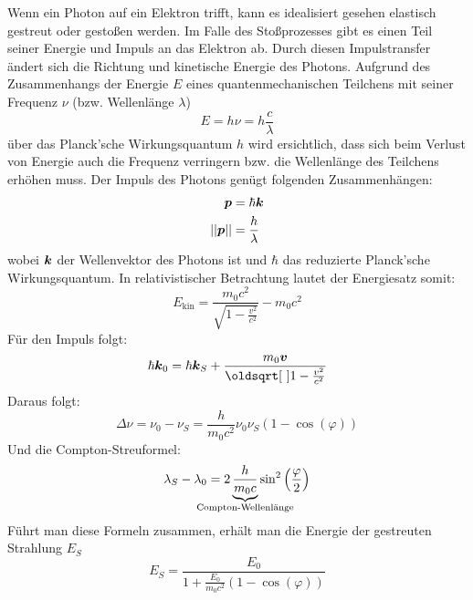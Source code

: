 \documentclass[ngerman]{scrartcl}
\begin{document}
Wenn ein Photon auf ein Elektron trifft, kann es idealisiert gesehen elastisch gestreut oder gestoßen werden. Im Falle des Stoßprozesses gibt es einen Teil seiner Energie und Impuls an das Elektron ab. Durch diesen Impulstransfer ändert sich die Richtung und kinetische Energie des Photons.
Aufgrund des Zusammenhangs der Energie $E$ eines quantenmechanischen Teilchens mit seiner Frequenz $\nu$ (bzw. Wellenlänge $\lambda$)
\begin{equation}
    \label{eq:energie_frequenz_wellenlaenge}
    E = h \nu = h \frac{c}{\lambda}
\end{equation}
über das Planck'sche Wirkungsquantum $h$ wird ersichtlich, dass sich beim Verlust von Energie auch die Frequenz verringern bzw. die Wellenlänge des Teilchens erhöhen muss. Der Impuls des Photons genügt folgenden Zusammenhängen:
\begin{align}
    \vb*{p}     & = \hbar \vb*{k} \label{eq:impuls}            \\
    ||\vb*{p}|| & = \frac{h}{\lambda} \label{eq:impuls_betrag}
\end{align}
wobei $\vb*{k}$ der Wellenvektor des Photons ist und $\hbar$ das reduzierte Planck'sche Wirkungsquantum.
In relativistischer Betrachtung lautet der Energiesatz somit:
\begin{equation}
    \label{eq:energiesatz_relativistisch}
    E_{\text{kin}} = \frac{m_0c^2}{\sqrt{1-\frac{v^2}{c^2}}} - m_0 c^2
\end{equation}
Für den Impuls folgt:
\begin{equation}
    \label{eq:impuls_beziehung}
    \hbar \vb*{k}_0 = \hbar \vb*{k}_S + \frac{m_0 \vb*{v}}{\sqrt{1-\frac{v^2}{c^2}}}
\end{equation}
Daraus folgt:
\begin{equation}
    \label{eq:Delta_nu}
    \Delta \nu = \nu_0 - \nu_S = \frac{h}{m_0 c^2} \nu_0 \nu_S (1-\cos(\varphi))
\end{equation}
Und die Compton-Streuformel:
\begin{equation}
    \label{eq:}
    \lambda_S - \lambda_0 = 2 \underbrace{\frac{h}{m_0 c}}_{\mathclap{\text{Compton-Wellenlänge}}} \sin^2\left(\frac{\varphi}{2}\right)
\end{equation}
Führt man diese Formeln zusammen, erhält man die Energie der gestreuten Strahlung $E_S$
\begin{equation}
    \label{eq:energie_gestreute_strahlung}
    E_S = \frac{E_0}{1 + \frac{E_0}{m_0 c^2} (1-\cos(\varphi))}
\end{equation}
\end{document}
